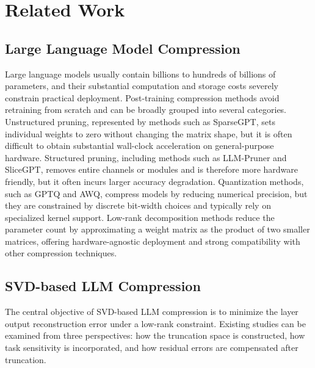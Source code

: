 \documentclass[a4paper,fleqn]{cas-dc}
\begin{document}
\section{Related Work}

\subsection{Large Language Model Compression}

Large language models usually contain billions to hundreds of billions of parameters, and their substantial computation and storage costs severely constrain practical deployment. Post-training compression methods avoid retraining from scratch and can be broadly grouped into several categories. Unstructured pruning, represented by methods such as SparseGPT, sets individual weights to zero without changing the matrix shape, but it is often difficult to obtain substantial wall-clock acceleration on general-purpose hardware. Structured pruning, including methods such as LLM-Pruner and SliceGPT, removes entire channels or modules and is therefore more hardware friendly, but it often incurs larger accuracy degradation. Quantization methods, such as GPTQ and AWQ, compress models by reducing numerical precision, but they are constrained by discrete bit-width choices and typically rely on specialized kernel support. Low-rank decomposition methods reduce the parameter count by approximating a weight matrix as the product of two smaller matrices, offering hardware-agnostic deployment and strong compatibility with other compression techniques.

\subsection{SVD-based LLM Compression}

The central objective of SVD-based LLM compression is to minimize the layer output reconstruction error under a low-rank constraint. Existing studies can be examined from three perspectives: how the truncation space is constructed, how task sensitivity is incorporated, and how residual errors are compensated after truncation.
\end{document}
